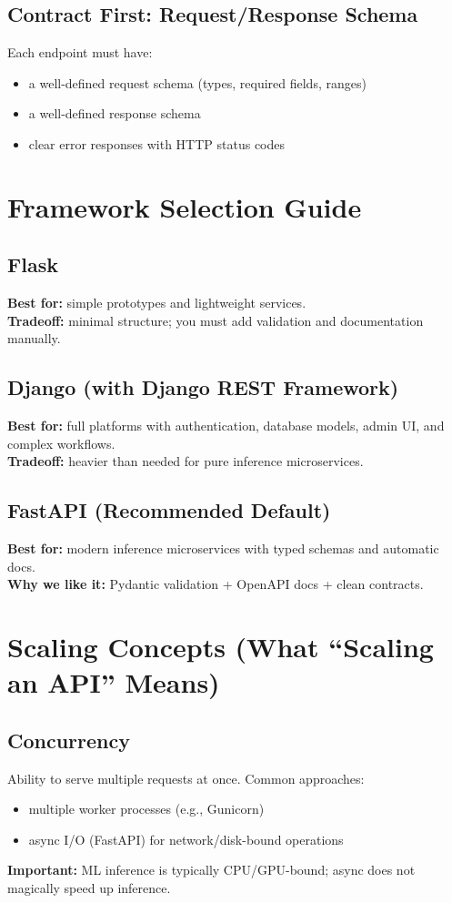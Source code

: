 \documentclass[11pt]{article}
\begin{document}
\subsection{Contract First: Request/Response Schema}
Each endpoint must have:
\begin{itemize}
  \item a well-defined request schema (types, required fields, ranges)
  \item a well-defined response schema
  \item clear error responses with HTTP status codes
\end{itemize}

\section{Framework Selection Guide}

\subsection{Flask}
\textbf{Best for:} simple prototypes and lightweight services.\\
\textbf{Tradeoff:} minimal structure; you must add validation and documentation manually.

\subsection{Django (with Django REST Framework)}
\textbf{Best for:} full platforms with authentication, database models, admin UI, and complex workflows.\\
\textbf{Tradeoff:} heavier than needed for pure inference microservices.

\subsection{FastAPI (Recommended Default)}
\textbf{Best for:} modern inference microservices with typed schemas and automatic docs.\\
\textbf{Why we like it:} Pydantic validation + OpenAPI docs + clean contracts.

\section{Scaling Concepts (What ``Scaling an API'' Means)}

\subsection{Concurrency}
Ability to serve multiple requests at once.
Common approaches:
\begin{itemize}
  \item multiple worker processes (e.g., Gunicorn)
  \item async I/O (FastAPI) for network/disk-bound operations
\end{itemize}
\textbf{Important:} ML inference is typically CPU/GPU-bound; async does not magically speed up inference.
\end{document}
